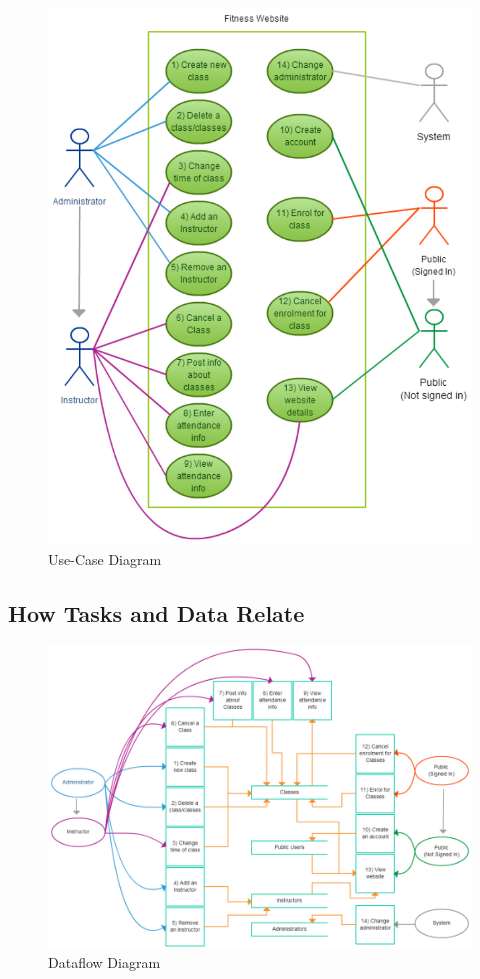 \documentclass[11pt, article]{article}
\begin{document}
	\begin{figure}[ht!]
	\includegraphics[scale=1]{images/usecase}
 	\caption{Use-Case Diagram}
	\end{figure}
	
	\newpage
	
	\subsection{How Tasks and Data Relate}
	
		\begin{figure}[ht!]
	\includegraphics[scale=0.6]{images/dataflow}
 	\caption{Dataflow Diagram}
	\end{figure}
	
\end{document}
